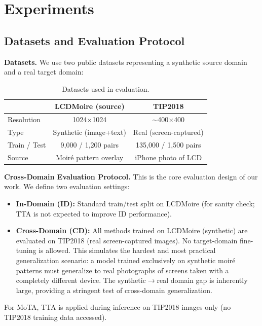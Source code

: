 \documentclass[10pt,twocolumn,letterpaper]{article}
\begin{document}
\FloatBarrier
\section{Experiments}

\subsection{Datasets and Evaluation Protocol}

\textbf{Datasets.} We use two public datasets representing a synthetic source domain and a real target domain:
\begin{table}[tbp]
\centering
\footnotesize
\caption{Datasets used in evaluation.}
\label{tab:datasets}
\begin{tabular}{@{}p{2.2cm}cc@{}}
\toprule
& \textbf{LCDMoire} (source) \cite{zheng2022learning} & \textbf{TIP2018} \cite{sun2018moire} \\
\midrule
Resolution & 1024$\times$1024 & $\sim$400$\times$400 \\
Type & Synthetic (image+text) & Real (screen-captured) \\
Train / Test & 9,000 / 1,200 pairs & 135,000 / 1,500 pairs \\
Source & Moir\'{e} pattern overlay & iPhone photo of LCD \\
\bottomrule
\end{tabular}
\end{table}

\textbf{Cross-Domain Evaluation Protocol.} This is the core evaluation design of our work. We define two evaluation settings:
\begin{itemize}
    \item \textbf{In-Domain (ID):} Standard train/test split on LCDMoire (for sanity check; TTA is not expected to improve ID performance).
    \item \textbf{Cross-Domain (CD):} All methods trained on LCDMoire (synthetic) are evaluated on TIP2018 (real screen-captured images). No target-domain fine-tuning is allowed. This simulates the hardest and most practical generalization scenario: a model trained exclusively on synthetic moir\'{e} patterns must generalize to real photographs of screens taken with a completely different device. The synthetic$\to$real domain gap is inherently large, providing a stringent test of cross-domain generalization.
\end{itemize}

For MoTA, TTA is applied during inference on TIP2018 images only (no TIP2018 training data accessed).
\end{document}
